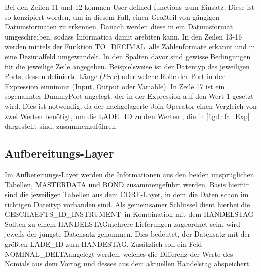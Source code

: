 Bei den Zeilen 11 und 12 kommen \glqq User-defined-functions\grqq~zum Einsatz. Diese ist so konzipiert worden, um in diesem Fall, einen Großteil von gängigen Datumsformaten zu erkennen. Danach werden diese in ein Datumsformat umgeschreiben, sodass Informatica damit arebiten kann. In den Zeilen 13-16 werden mittels der Funktion \glqq TO\_DECIMAL\grqq~alle Zahlenformate erkannt und in eine Dezimalfeld umgewandelt. In den Spalten davor sind gewisse Bedingungen für die jeweilige Zeile angegeben. Beispielsweise ist der Datentyp des jeweiligen Ports, dessen definierte Länge ($Prec$) oder welche Rolle der Port in der Expression einnimmt (Input, Output oder Variable). In Zeile 17 ist ein sogenannter DummyPort angelegt, der in der Expression auf den Wert 1 gesetzt wird. Dies ist notwendig, da der nachgelagerte Join-Operator einen Vergleich von zwei Werten benötigt, um die LADE\_ID zu den Werten , die in \autoref{fig:Infa_Exp} dargestellt sind, zusammenzuführen
\subsection{Aufbereitungs-Layer}
Im Aufbereitungs-Layer werden die Informationen aus den beiden unsprüglichen Tabellen, MASTERDATA und BOND zusammengeführt werden. Basis hierfür sind die jeweiligen Tabellen aus dem CORE-Layer, in dem die Daten schon im richtigen Dateityp vorhanden sind. Als gemeinsamer Schlüssel dient hierbei die \glqq GESCHAEFTS\_ID\_INSTRUMENT\grqq~in Kombination mit dem \glqq HANDELSTAG\grqq~ Sollten zu einem HANDELSTAGmehrere Lieferungen zugeordnet sein, wird jeweils der jüngste Datensatz genommen. Dies bedeutet, der Datensatz mit der größten LADE\_ID zum HANDESTAG. 
Zusätzlich soll ein Feld \glqq NOMINAL\_DELTA\grqq angelegt werden, welches die Differenz der Werte des Nomials aus dem Vortag und desses aus dem aktuellen Handelstag abspeichert.

